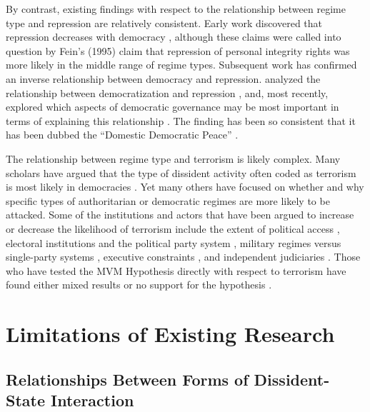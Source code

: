 \documentclass[titlepage, onecolumn,12pt]{article}
\begin{document}
By contrast, existing findings with respect to the relationship between regime type and repression are relatively consistent. Early work discovered that repression decreases with democracy \citep{Henderson1991,PoeTate1994}, although these claims were called into question by Fein's (1995) claim that repression of personal integrity rights was more likely in the middle range of regime types. Subsequent work has confirmed an inverse relationship between democracy and repression. \citep{Davenport1995,cingranelli1999respect,davenport2004democracy,Davenport2007book} analyzed the relationship between democratization and repression \citep{Davenport1999}, and, most recently, explored which aspects of democratic governance may be most important in terms of explaining this relationship \citep{BDMetal2005,Davenport2007book,ConradMoore2010,HillJones,lupu2015legislative}. The finding has been so consistent that it has been dubbed the ``Domestic Democratic Peace'' \citep{Davenport2007book}.

The relationship between regime type and terrorism is likely complex. Many scholars have argued that the type of dissident activity often coded as terrorism is most likely in democracies \citep{eubank2001terrorism,chenoweth2010democratic}. Yet many others have focused on whether and why specific types of authoritarian or democratic regimes are more likely to be attacked. Some of the institutions and actors that have been argued to increase or decrease the likelihood of terrorism include the extent of political access \citep{brooks2009researching}, electoral institutions and the political party system \citep{aksoy2012terrorism,aksoy2014electoral}, military regimes versus single-party systems \citep{wilson2013autocracies}, executive constraints \citep{young2011promise}, and independent judiciaries \citep{findley2011terrorism}. Those who have tested the MVM Hypothesis directly with respect to terrorism have found either mixed results \citep{wade2007does} or no support for the hypothesis \citep{urdal2006clash}.

\section{Limitations of Existing Research}

\subsection{Relationships Between Forms of Dissident-State Interaction}
\end{document}
